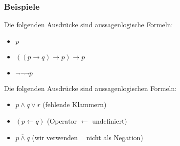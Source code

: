 \documentclass[onlymath]{beamer}
\begin{document}
\begin{frame}\frametitle{Beispiele}

Die folgenden Ausdrücke sind aussagenlogische Formeln:
\begin{itemize}
\item $p$
\item $((p\to q)\to p)\to p$
\item $\neg \neg \neg p$
\end{itemize}
\medskip

Die folgenden Ausdrücke sind  aussagenlogischen Formeln:
\begin{itemize}
\item $p\wedge q \vee r$ (fehlende Klammern)\\
\item $(p\leftarrow q)$ (Operator $\leftarrow$ undefiniert)
\item $\overline{p\wedge q}$ (wir verwenden $\overline{\phantom{x}}$ nicht als Negation)
\end{itemize}

\end{frame}
\end{document}

